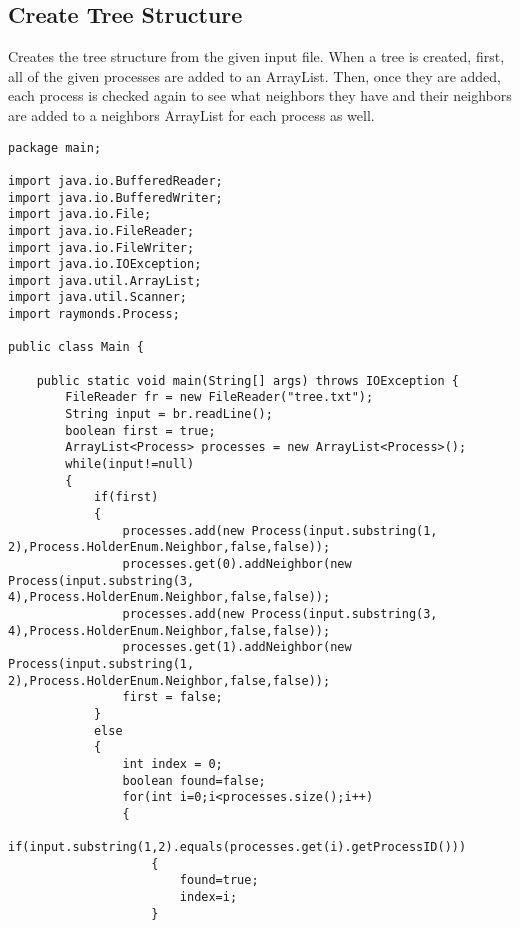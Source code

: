 \documentclass{article}
\begin{document}
		\subsection{Create Tree Structure}
		Creates the tree structure from the given input file. When a tree is created,  first,  all of the given processes are added to an ArrayList. Then, once they are added, each process is checked again to see what neighbors they have and their neighbors are added to a neighbors ArrayList for each process as well.
		\begin{lstlisting}
package main;

import java.io.BufferedReader;
import java.io.BufferedWriter;
import java.io.File;
import java.io.FileReader;
import java.io.FileWriter;
import java.io.IOException;
import java.util.ArrayList;
import java.util.Scanner;
import raymonds.Process;

public class Main {

	public static void main(String[] args) throws IOException {
		FileReader fr = new FileReader("tree.txt");
		String input = br.readLine();
		boolean first = true;
		ArrayList<Process> processes = new ArrayList<Process>();
		while(input!=null)
		{
			if(first)
			{
				processes.add(new Process(input.substring(1, 2),Process.HolderEnum.Neighbor,false,false));
				processes.get(0).addNeighbor(new Process(input.substring(3, 4),Process.HolderEnum.Neighbor,false,false));
				processes.add(new Process(input.substring(3, 4),Process.HolderEnum.Neighbor,false,false));
				processes.get(1).addNeighbor(new Process(input.substring(1, 2),Process.HolderEnum.Neighbor,false,false));
				first = false;
			}
			else
			{
				int index = 0;
				boolean found=false;
				for(int i=0;i<processes.size();i++)
				{
					if(input.substring(1,2).equals(processes.get(i).getProcessID()))
					{
						found=true;
						index=i;
					}
					

\end{lstlisting}
\end{document}
